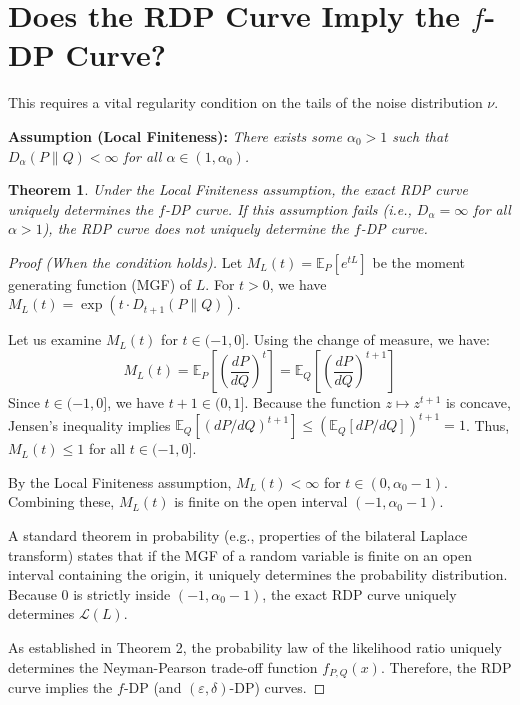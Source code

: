 \documentclass[11pt]{article}
\newtheorem{theorem}{Theorem}
\begin{document}
\section{Does the RDP Curve Imply the $f$-DP Curve?}

This requires a vital regularity condition on the tails of the noise distribution $\nu$.

\vspace{0.5em}
\noindent\textbf{Assumption (Local Finiteness):} \textit{There exists some $\alpha_0 > 1$ such that $D_\alpha(P\|Q) < \infty$ for all $\alpha \in (1, \alpha_0)$.}
\vspace{0.5em}

\begin{theorem}
Under the Local Finiteness assumption, the exact RDP curve uniquely determines the $f$-DP curve. If this assumption fails (i.e., $D_\alpha = \infty$ for all $\alpha > 1$), the RDP curve does \emph{not} uniquely determine the $f$-DP curve.
\end{theorem}

\begin{proof}[Proof (When the condition holds)]
Let $M_L(t) = \mathbb{E}_P[e^{tL}]$ be the moment generating function (MGF) of $L$. 
For $t > 0$, we have $M_L(t) = \exp(t \cdot D_{t+1}(P\|Q))$. 

Let us examine $M_L(t)$ for $t \in (-1, 0]$. Using the change of measure, we have:
\[ M_L(t) = \mathbb{E}_P \left[ \left(\frac{dP}{dQ}\right)^t \right] = \mathbb{E}_Q \left[ \left(\frac{dP}{dQ}\right)^{t+1} \right] \]
Since $t \in (-1, 0]$, we have $t+1 \in (0, 1]$. Because the function $z \mapsto z^{t+1}$ is concave, Jensen's inequality implies $\mathbb{E}_Q[(dP/dQ)^{t+1}] \le (\mathbb{E}_Q[dP/dQ])^{t+1} = 1$. Thus, $M_L(t) \le 1$ for all $t \in (-1, 0]$.

By the Local Finiteness assumption, $M_L(t) < \infty$ for $t \in (0, \alpha_0 - 1)$. 
Combining these, $M_L(t)$ is finite on the open interval $(-1, \alpha_0 - 1)$. 

A standard theorem in probability (e.g., properties of the bilateral Laplace transform) states that if the MGF of a random variable is finite on an open interval containing the origin, it uniquely determines the probability distribution. Because $0$ is strictly inside $(-1, \alpha_0 - 1)$, the exact RDP curve uniquely determines $\mathcal{L}(L)$. 

As established in Theorem 2, the probability law of the likelihood ratio uniquely determines the Neyman-Pearson trade-off function $f_{P,Q}(x)$. Therefore, the RDP curve implies the $f$-DP (and $(\varepsilon,\delta)$-DP) curves.
\end{proof}
\end{document}
